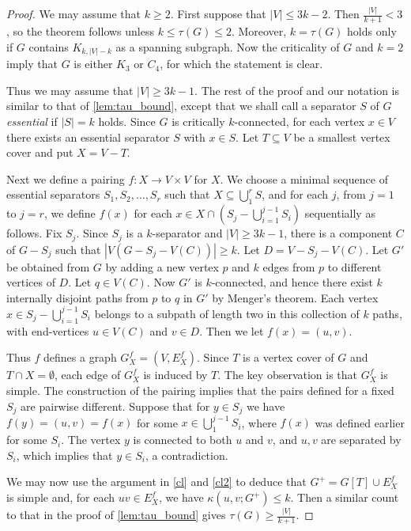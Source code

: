 \documentclass[11pt,a4paper,dvipsnames]{scrartcl}
\begin{document}
\begin{proof}
We may assume that $k\geq 2$. First suppose that $|V|\leq 3k-2$.
Then $\frac{|V|}{k+1}<3$, so the theorem follows unless $k\leq \tau(G)\leq 2$.
Moreover, $k=\tau(G)$ holds only if $G$ contains $K_{k,|V|-k}$ as a spanning subgraph. Now the criticality of $G$ and $k=2$ imply that $G$ is 
either $K_3$ or $C_4$, for which the statement is clear.

Thus we may assume that $|V|\geq 3k-1$. The rest of the proof and 
our notation is similar to
that of \cref{lem:tau_bound}, except that 
we shall call a separator $S$ of $G$ 
{\itshape essential} if $|S|=k$ holds. 
Since $G$ is critically $k$-connected, for each vertex
$x\in V$ there exists an essential separator  $S$ with $x\in S$. 
Let $T\subseteq V$ be a smallest vertex cover and 
put $X=V-T$.

Next we define a pairing $f:X\to V\times V$ for $X$.
We choose a minimal sequence of essential separators $S_1,S_2,\dots,S_r$ such that
$X\subseteq \bigcup_1^r S$, and for each $j$, from $j=1$ to $j=r$,
we define $f(x)$ for
each $x\in X\cap (S_j-\bigcup_{i=1}^{j-1} S_i)$ sequentially as follows.
Fix $S_j$.
Since $S_j$
is a $k$-separator and $|V|\geq 3k-1$, there is a component $C$ of $G-S_j$
such that $|V(G-S_j-V(C))|\geq k.$ Let $D=V-S_j-V(C)$.
Let $G'$ be obtained from $G$ by
adding a new vertex $p$ and $k$ edges from $p$ to different vertices of $D$.
Let $q\in V(C)$. Now $G'$ is $k$-connected, and hence there exist $k$
internally disjoint paths from $p$ to $q$ in $G'$ by Menger's theorem.
Each vertex $x\in S_j-\bigcup_{i=1}^{j-1} S_i$ belongs to a subpath of length two in this collection
of $k$ paths, with end-vertices $u\in V(C)$ and $v\in D$.
Then we let $f(x)=(u,v)$.

Thus $f$ defines a graph $G_X^f=(V,E_X^f)$.
Since $T$ is a vertex cover of $G$ and $T\cap X=\emptyset$, each edge of $G_X^f$ is induced by $T$.
The key observation is that $G_X^f$ is simple.
The construction of
the pairing implies that the pairs defined for a fixed $S_j$ are
pairwise different. 
Suppose that for $y\in S_j$ we have $f(y)=(u,v)=f(x)$ for some
$x\in \bigcup_1^{j-1} S_i$, where $f(x)$ was defined earlier for some
$S_i$. The vertex $y$ is connected to both $u$ and $v$, and $u,v$ are separated by $S_i$,
which implies that $y\in S_i$, a contradiction. 

We may now use the argument in \cref{cl} and  \cref{cl2} to deduce that $G^+=G[T]\cup E_X^f$ is simple and,
for each $uv\in E_X^f$, we have $\kappa(u,v;G^+)\leq k$.
Then a similar count to that in the proof of \cref{lem:tau_bound} gives $\tau(G)\geq \frac{|V|}{k+1}$.
\end{proof}
\end{document}
